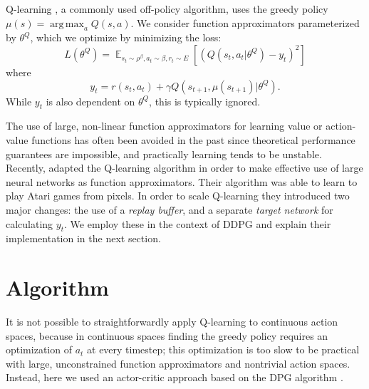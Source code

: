 \documentclass{article} %
\DeclareMathOperator{\E}{\mathbb{E}} %
\DeclareMathOperator*{\argmax}{arg\,max}
\begin{document}
Q-learning \citep{watkins1992q}, a commonly used off-policy algorithm,
uses the greedy policy $\mu(s) = \argmax_a Q(s, a)$. We consider
function approximators parameterized by $\theta^Q$, which we optimize
by minimizing the loss:
\begin{equation} \label{eq:dqnloss}
  L(\theta^{Q}) = \E_{s_t \sim \rho^\beta, a_t \sim \beta, r_t \sim E}
  \left[\left(Q(s_t, a_t | \theta^{Q}) - y_t\right)^2 \right]
\end{equation}
where
\begin{equation} \label{eq:dqn}
  y_t =  r(s_t, a_t) +
      \gamma Q(s_{t+1}, \mu(s_{t+1}) | \theta^Q).
\end{equation}
While $y_t$ is also dependent on $\theta^Q$, this is typically ignored.

The use of large, non-linear function approximators for learning value
or action-value functions has often been avoided in the past since
theoretical performance guarantees are impossible, and practically
learning tends to be unstable.  Recently,
\citep{mnih2013playing,mnih2015human} adapted the Q-learning algorithm
in order to make effective use of large neural networks as function
approximators.  Their algorithm was able to learn to play Atari games
from pixels.  In order to scale Q-learning they introduced two major
changes: the use of a \textit{replay buffer}, and a separate
\textit{target network} for calculating $y_t$. We employ these in the
context of DDPG and explain their implementation in the next section.

\section{Algorithm}

It is not possible to straightforwardly apply Q-learning to continuous
action spaces, because in continuous spaces finding the greedy policy requires an
optimization of $a_t$ at every
timestep; this optimization is too slow to be practical with large, unconstrained
function approximators and nontrivial action spaces.
Instead, here we used an actor-critic approach based
on the DPG algorithm \citep{silver2014deterministic}.
\end{document}

